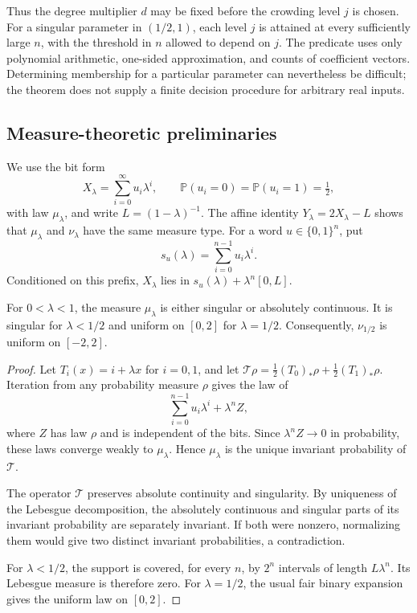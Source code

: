 Thus the degree multiplier $d$ may be fixed before the crowding level
$j$ is chosen.  For a singular parameter in $(1/2,1)$, each level $j$
is attained at every sufficiently large $n$, with the threshold in $n$
allowed to depend on $j$.  The predicate uses only polynomial arithmetic,
one-sided approximation, and counts of coefficient vectors.  Determining
membership for a particular parameter can nevertheless be difficult; the
theorem does not supply a finite decision procedure for arbitrary real
inputs.

\subsection{Measure-theoretic preliminaries}
\label{cls:subsection-preliminaries}

We use the bit form
\[
  X_\lambda=\sum_{i=0}^\infty u_i\lambda^i,
  \qquad \mathbb P(u_i=0)=\mathbb P(u_i=1)=\tfrac12,
\]
with law $\mu_\lambda$, and write $L=(1-\lambda)^{-1}$.
The affine identity $Y_\lambda=2X_\lambda-L$ shows that $\mu_\lambda$
and $\nu_\lambda$ have the same measure type.  For a word
$u\in\{0,1\}^n$, put
\begin{equation}
  s_u(\lambda)=\sum_{i=0}^{n-1}u_i\lambda^i.
  \label{cls:prefix-sum}
\end{equation}
Conditioned on this prefix, $X_\lambda$ lies in
$s_u(\lambda)+\lambda^n[0,L]$.

\begin{lemma}
\label{cls:pure-type}
For $0<\lambda<1$, the measure $\mu_\lambda$ is either singular or
absolutely continuous.  It is singular for $\lambda<1/2$ and uniform on
$[0,2]$ for $\lambda=1/2$.  Consequently, $\nu_{1/2}$ is uniform on
$[-2,2]$.
\end{lemma}

\begin{proof}
Let $T_i(x)=i+\lambda x$ for $i=0,1$, and let
$\mathcal T\rho=\tfrac12(T_0)_*\rho+\tfrac12(T_1)_*\rho$.
Iteration from any probability measure $\rho$ gives the law of
\[
  \sum_{i=0}^{n-1}u_i\lambda^i+\lambda^n Z,
\]
where $Z$ has law $\rho$ and is independent of the bits.  Since
$\lambda^nZ\to0$ in probability, these laws converge weakly to
$\mu_\lambda$.  Hence $\mu_\lambda$ is the unique invariant probability
of $\mathcal T$.

The operator $\mathcal T$ preserves absolute continuity and singularity.
By uniqueness of the Lebesgue decomposition, the absolutely continuous
and singular parts of its invariant probability are separately invariant.
If both were nonzero, normalizing them would give two distinct invariant
probabilities, a contradiction.

For $\lambda<1/2$, the support is covered, for every $n$, by $2^n$
intervals of length $L\lambda^n$.  Its Lebesgue measure is therefore
zero.  For $\lambda=1/2$, the usual fair binary expansion gives the uniform
law on $[0,2]$.
\end{proof}


